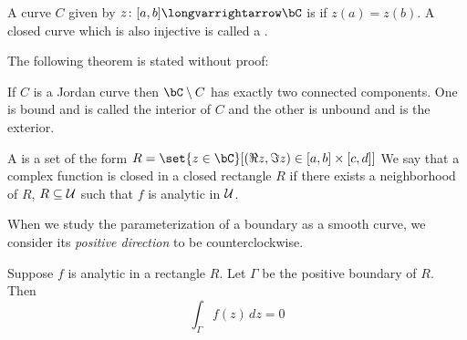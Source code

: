 \documentclass[10pt]{article}
\def\mU{{\cal U}}
\let\longto=\longvarrightarrow
\begin{document}
\begin{defn*}

    A curve $C$ given by $z\colon[a,b]\longto\bC$ is  if $z(a)=z(b)$.
    A closed curve which is also injective is called a .

\end{defn*}

The following theorem is stated without proof:

\begin{thrm*}

    If $C$ is a Jordan curve then $\bC\setminus C$ has exactly two connected components.
    One is bound and is called the interior of $C$ and the other is unbound and is the exterior.

\end{thrm*}

\begin{defn*}

    A  is a set of the form $R=\set{z\in\bC}[{(\Re z,\Im z)\in[a,b]\times[c,d]}]$
    We say that a complex function is closed in a closed rectangle $R$ if there exists a neighborhood of $R$, $R\subseteq\mU$ such that $f$ is analytic in $\mU$.

\end{defn*}

When we study the parameterization of a boundary as a smooth curve, we consider its \emph{positive direction} to be counterclockwise.

\begin{thrm*}

    Suppose $f$ is analytic in a rectangle $R$.
    Let $\Gamma$ be the positive boundary of $R$.
    Then
    \[ \int_\Gamma f(z)\,dz = 0 \]

\end{thrm*}
\end{document}
